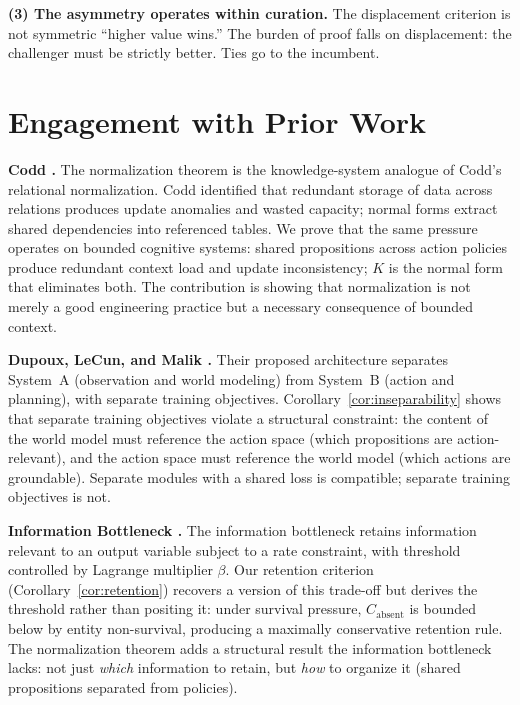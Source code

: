 \documentclass[11pt]{article}
\theoremstyle{definition}
\theoremstyle{remark}
\begin{document}
\textbf{(3) The asymmetry operates within curation.} The displacement
criterion is not symmetric ``higher value wins.'' The burden of proof
falls on displacement: the challenger must be strictly better. Ties go
to the incumbent.

\section{Engagement with Prior Work}
\label{sec:discussion}

\textbf{Codd \cite{Codd1970}.}
The normalization theorem is the knowledge-system analogue of Codd's
relational normalization. Codd identified that redundant storage of
data across relations produces update anomalies and wasted capacity;
normal forms extract shared dependencies into referenced tables. We
prove that the same pressure operates on bounded cognitive systems:
shared propositions across action policies produce redundant context
load and update inconsistency; $K$ is the normal form that eliminates
both. The contribution is showing that normalization is not merely a
good engineering practice but a necessary consequence of bounded context.

\textbf{Dupoux, LeCun, and Malik \cite{DupouxLeCunMalik2026}.}
Their proposed architecture separates System~A (observation and world
modeling) from System~B (action and planning), with separate training
objectives. Corollary~\ref{cor:inseparability} shows that separate
training objectives violate a structural constraint: the content of
the world model must reference the action space (which propositions are
action-relevant), and the action space must reference the world model
(which actions are groundable). Separate modules with a shared loss is
compatible; separate training objectives is not.

\textbf{Information Bottleneck \cite{Tishby2000, Tishby2011}.}
The information bottleneck retains information relevant to an output
variable subject to a rate constraint, with threshold controlled by
Lagrange multiplier $\beta$. Our retention criterion
(Corollary~\ref{cor:retention}) recovers a version of this trade-off
but derives the threshold rather than positing it: under survival
pressure, $C_{\text{absent}}$ is bounded below by entity non-survival,
producing a maximally conservative retention rule. The normalization
theorem adds a structural result the information bottleneck lacks:
not just \emph{which} information to retain, but \emph{how} to
organize it (shared propositions separated from policies).
\end{document}
